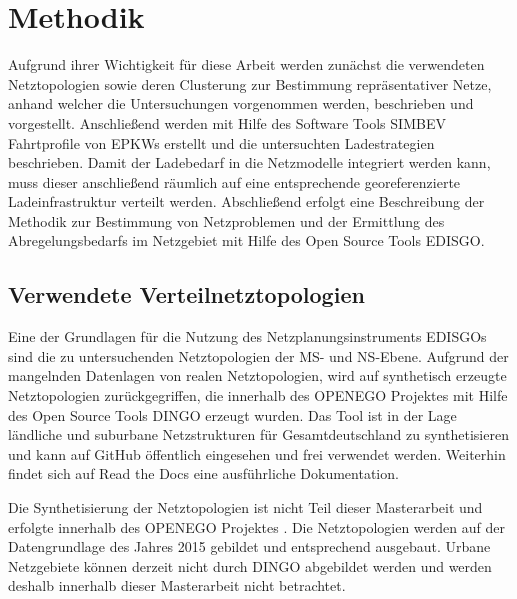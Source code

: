 \section{Methodik}\label{chap:Methodik}

Aufgrund ihrer Wichtigkeit für diese Arbeit werden zunächst die verwendeten Netztopologien sowie deren Clusterung zur Bestimmung repräsentativer Netze, anhand welcher die Untersuchungen vorgenommen werden, beschrieben und vorgestellt.
Anschließend werden mit Hilfe des Software Tools \gls{SIMBEV} Fahrtprofile von \glspl{EPKW} erstellt und die untersuchten Ladestrategien beschrieben.
Damit der Ladebedarf in die Netzmodelle integriert werden kann, muss dieser anschließend räumlich auf eine entsprechende georeferenzierte Ladeinfrastruktur verteilt werden.
Abschließend erfolgt eine Beschreibung der Methodik zur Bestimmung von Netzproblemen und der Ermittlung des Abregelungsbedarfs im Netzgebiet mit Hilfe des Open Source Tools \gls{EDISGO}.


\subsection{Verwendete Verteilnetztopologien}\label{chap:dingo_theo}

Eine der Grundlagen für die Nutzung des Netzplanungsinstruments \glspl{EDISGO} sind die zu untersuchenden Netztopologien der \gls{MS}- und \gls{NS}-Ebene.
Aufgrund der mangelnden Datenlagen von realen Netztopologien, wird auf synthetisch erzeugte Netztopologien zurückgegriffen, die innerhalb des \gls{OPENEGO} Projektes \cite{Mueller2019} mit Hilfe des Open Source Tools \gls{DINGO} erzeugt wurden.
Das Tool ist in der Lage ländliche und suburbane Netzstrukturen für Gesamtdeutschland zu synthetisieren und kann auf GitHub \cite{dingo2019} öffentlich eingesehen und frei verwendet werden.
Weiterhin findet sich auf Read the Docs \cite{dingo-docs2019} eine ausführliche Dokumentation.\medskip

Die Synthetisierung der Netztopologien ist nicht Teil dieser Masterarbeit und erfolgte innerhalb des \gls{OPENEGO} Projektes \cite{Mueller2019}.
Die Netztopologien werden auf der Datengrundlage des Jahres \num{2015} gebildet und entsprechend ausgebaut.
Urbane Netzgebiete können derzeit nicht durch \gls{DINGO} abgebildet werden und werden deshalb innerhalb dieser Masterarbeit nicht betrachtet. \medskip

